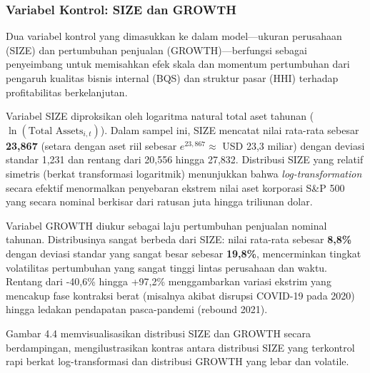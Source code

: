 \documentclass[12pt,a4paper]{article}
\begin{document}
\subsubsection{Variabel Kontrol: SIZE dan
GROWTH}\label{variabel-kontrol-size-dan-growth}

Dua variabel kontrol yang dimasukkan ke dalam model---ukuran perusahaan
(SIZE) dan pertumbuhan penjualan (GROWTH)---berfungsi sebagai
penyeimbang untuk memisahkan efek skala dan momentum pertumbuhan dari
pengaruh kualitas bisnis internal (BQS) dan struktur pasar (HHI)
terhadap profitabilitas berkelanjutan.

Variabel SIZE diproksikan oleh logaritma natural total aset tahunan
(\(\ln(\text{Total Assets}_{i,t})\)). Dalam sampel ini, SIZE mencatat
nilai rata-rata sebesar \textbf{23,867} (setara dengan aset riil sebesar
\(e^{23,867} \approx\) USD 23,3 miliar) dengan deviasi standar 1,231 dan
rentang dari 20,556 hingga 27,832. Distribusi SIZE yang relatif simetris
(berkat transformasi logaritmik) menunjukkan bahwa
\emph{log-transformation} secara efektif menormalkan penyebaran ekstrem
nilai aset korporasi S\&P 500 yang secara nominal berkisar dari ratusan
juta hingga triliunan dolar.

Variabel GROWTH diukur sebagai laju pertumbuhan penjualan nominal
tahunan. Distribusinya sangat berbeda dari SIZE: nilai rata-rata sebesar
\textbf{8,8\%} dengan deviasi standar yang sangat besar sebesar
\textbf{19,8\%}, mencerminkan tingkat volatilitas pertumbuhan yang
sangat tinggi lintas perusahaan dan waktu. Rentang dari -40,6\% hingga
+97,2\% menggambarkan variasi ekstrim yang mencakup fase kontraksi berat
(misalnya akibat disrupsi COVID-19 pada 2020) hingga ledakan pendapatan
pasca-pandemi (rebound 2021).

Gambar 4.4 memvisualisasikan distribusi SIZE dan GROWTH secara
berdampingan, mengilustrasikan kontras antara distribusi SIZE yang
terkontrol rapi berkat log-transformasi dan distribusi GROWTH yang lebar
dan volatile.
\end{document}
